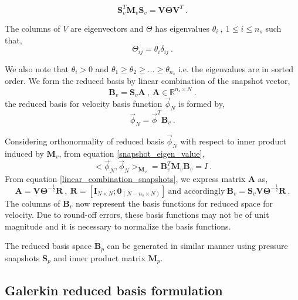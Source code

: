 \documentclass[graybox]{svmult}
\begin{document}
\begin{equation}\label{snapshot_eigen_value}
\bm{S}_v^T \bm{M}_v \bm{S}_v = \bm{V} \bm{\Theta} \bm{V}^T \ .
\end{equation}

The columns of $V$ are eigenvectors and $\Theta$ has eigenvalues $\theta_i \ , \ 1 \leq i \leq n_s$ such that,
\begin{equation}
\Theta_{ij} = \theta_i \delta_{ij} \ .
\end{equation}

We also note that $\theta_i > 0$ and $\theta_1 \geq \theta_2 \geq ... \geq \theta_{n_s}$ i.e. the eigenvalues are in sorted order. We form the reduced basis by linear combination of the snapshot vector,
\begin{equation}\label{linear_combination_snapshots}
\bm{B}_v = \bm{S}_v \bm{A} \ , \ \bm{A} \in \mathbb{R}^{n_s \times N} \ .
\end{equation}
the reduced basis for velocity basis function $\overrightarrow{\phi}_N$ is formed by,
\begin{equation}
\overrightarrow{\phi}_N = \overrightarrow{\phi}^T \bm{B}_v \ .
\end{equation}

Considering orthonormality of reduced basis $\overrightarrow{\phi}_N$ with respect to inner product induced by $\bm{M}_v$, from equation \eqref{snapshot_eigen_value},
\begin{equation}
<\overrightarrow{\phi}_N,\overrightarrow{\phi}_N>_{\bm{M}_v} = \bm{B}_v^T \bm{M}_v \bm{B}_v = I \ .
\end{equation}
From equation \eqref{linear_combination_snapshots}, we express matrix $\bm{A}$ as,
\begin{equation}
\bm{A} = \bm{V} \bm{\Theta}^{-\frac{1}{2}} \bm{R} \ , \ \bm{R} = [\bm{I}_{N \times N} ; \bm{0}_{(N-n_s \times N)}] \ \text{and accordingly} \ \bm{B}_v = \bm{S}_v \bm{V} \bm{\Theta}^{-\frac{1}{2}} \bm{R} \ .
\end{equation}
The columns of $\bm{B}_v$ now represent the basis functions for reduced space for velocity. Due to round-off errors, these basis functions may not be of unit magnitude and it is necessary to normalize the basis functions.

The reduced basis space $\bm{B}_p$ can be generated in similar manner using pressure snapshots $\bm{S}_p$ and inner product matrix $\bm{M}_p$.

\subsection{Galerkin reduced basis formulation}\label{Galerkin_section}
\end{document}
